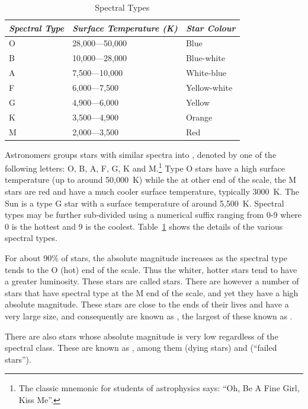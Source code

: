 \begin{table}[htb]
  \centering
  \begin{tabular}{lll}
\toprule
\emph{Spectral Type} & \emph{Surface Temperature (K)} & \emph{Star Colour}\\\midrule
O & 28,000---50,000 & Blue\\
B & 10,000---28,000 & Blue-white\\
A & 7,500---10,000 & White-blue\\
F & 6,000---7,500 & Yellow-white\\
G & 4,900---6,000 & Yellow\\
K & 3,500---4,900 & Orange\\
M & 2,000---3,500 & Red\\
\bottomrule    
  \end{tabular}
  \caption{Spectral Types}
  \label{tab:spectraltype}
\end{table}

Astronomers groups stars with similar spectra into , denoted by one of the following letters: O, B, A, F, G, K
and M.\footnote{The classic mnemonic for students of astrophysics
  says: ``Oh, Be A Fine Girl, Kiss Me''.}  Type O stars have a high
surface temperature (up to around 50,000~K) while the at other end of
the scale, the M stars are red and have a much cooler surface
temperature, typically 3000~K. The Sun is a type G star with a surface
temperature of around 5,500~K. Spectral types may be further
sub-divided using a numerical suffix ranging from 0-9 where 0 is the
hottest and 9 is the coolest. Table~\ref{tab:spectraltype} shows the
details of the various spectral types.

For about 90\% of stars, the absolute magnitude increases as the
spectral type tends to the O (hot) end of the scale. Thus the whiter,
hotter stars tend to have a greater luminosity. These stars are called
 stars. There are however a number of stars that
have spectral type at the M end of the scale, and yet they have a high
absolute magnitude. These stars are close to the ends of their lives
and have a very large size, and consequently are known as
, the largest of these known as .

There are also stars whose absolute magnitude is very low regardless
of the spectral class. These are known as , among
them  (dying stars) and 
(``failed stars'').

